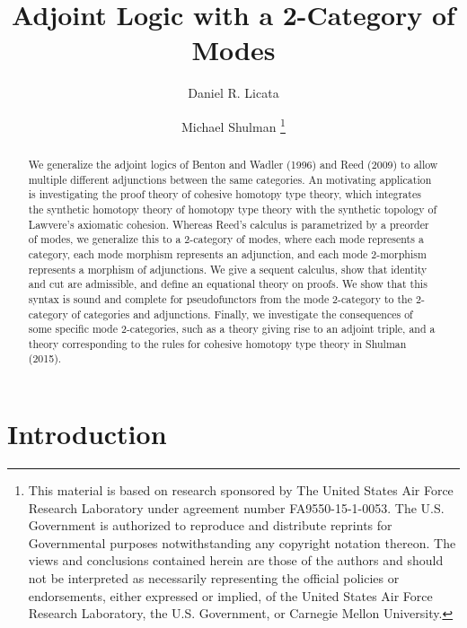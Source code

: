 \documentclass{drl-common/llncs}
\title{Adjoint Logic with a 2-Category of Modes}
\author{Daniel R. Licata\inst{1} \and Michael Shulman\inst{2}
\thanks{
This material is based on research sponsored by The United States Air
Force Research Laboratory under agreement number FA9550-15-1-0053. The
U.S. Government is authorized to reproduce and distribute reprints for
Governmental purposes notwithstanding any copyright notation thereon.
The views and conclusions contained herein are those of the authors and
should not be interpreted as necessarily representing the official
policies or endorsements, either expressed or implied, of the United
States Air Force Research Laboratory, the U.S. Government, or Carnegie
Mellon University.
}}
\institute{Wesleyan University \and University of San Diego}
\begin{document}
\maketitle

\begin{abstract}
We generalize the adjoint logics of Benton and Wadler (1996) and Reed
(2009) to allow multiple different adjunctions between the same
categories.  An motivating application is investigating the proof theory
of cohesive homotopy type theory, which integrates the synthetic
homotopy theory of homotopy type theory with the synthetic topology of
Lawvere's axiomatic cohesion.  Whereas Reed's calculus is parametrized by
a preorder of modes, we generalize this to a 2-category of modes, where
each mode represents a category, each mode morphism represents an
adjunction, and each mode 2-morphism represents a morphism of
adjunctions.  We give a sequent calculus, show that identity and cut are
admissible, and define an equational theory on proofs.  We show that
this syntax is sound and complete for pseudofunctors from the mode
2-category to the 2-category of categories and adjunctions.  Finally, we
investigate the consequences of some specific mode 2-categories, such as
a theory giving rise to an adjoint triple, and a theory corresponding to
the rules for cohesive homotopy type theory in Shulman (2015).
\end{abstract}

\section{Introduction}
\end{document}
